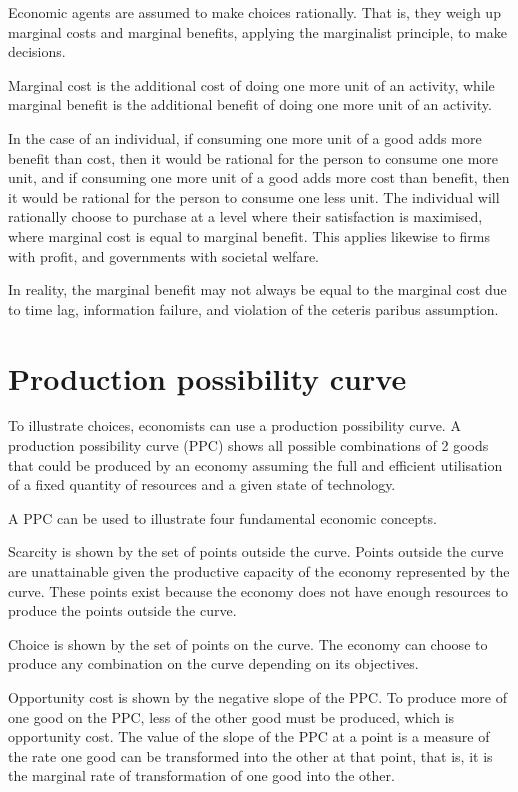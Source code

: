 \documentclass[Economics.tex]{subfiles}
\begin{document}
Economic agents are assumed to make choices rationally. That is, they weigh up marginal costs and marginal benefits, applying the marginalist principle, to make decisions.

Marginal cost is the additional cost of doing one more unit of an activity, while marginal benefit is the additional benefit of doing one more unit of an activity.

In the case of an individual, if consuming one more unit of a good adds more benefit than cost, then it would be rational for the person to consume one more unit, and if consuming one more unit of a good adds more cost than benefit, then it would be rational for the person to consume one less unit. The individual will rationally choose to purchase at a level where their satisfaction is maximised, where marginal cost is equal to marginal benefit. This applies likewise to firms with profit, and governments with societal welfare.

In reality, the marginal benefit may not always be equal to the marginal cost due to time lag, information failure, and violation of the ceteris paribus assumption.
\section{Production possibility curve}
To illustrate choices, economists can use a production possibility curve. A production possibility curve (PPC) shows all possible combinations of 2 goods that could be produced by an economy assuming the full and efficient utilisation of a fixed quantity of resources and a given state of technology.

A PPC can be used to illustrate four fundamental economic concepts.

Scarcity is shown by the set of points outside the curve. Points outside the curve are unattainable given the productive capacity of the economy represented by the curve. These points exist because the economy does not have enough resources to produce the points outside the curve.

Choice is shown by the set of points on the curve. The economy can choose to produce any combination on the curve depending on its objectives.

Opportunity cost is shown by the negative slope of the PPC. To produce more of one good on the PPC, less of the other good must be produced, which is opportunity cost. The value of the slope of the PPC at a point is a measure of the rate one good can be transformed into the other at that point, that is, it is the marginal rate of transformation of one good into the other.
\end{document}
